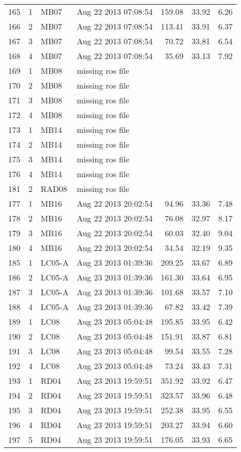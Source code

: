 \documentclass{article}
\begin{document}
\begin{longtable}{ccllrrr}
\hline 
165&1&MB07&Aug 22 2013 07:08:54&159.08&33.92&6.26\\
166&2&MB07&Aug 22 2013 07:08:54&113.41&33.91&6.37\\
167&3&MB07&Aug 22 2013 07:08:54&70.72&33.81&6.54\\
168&4&MB07&Aug 22 2013 07:08:54&35.69&33.13&7.92\\
\hline 
169&1&MB08&missing ros file&&&\\
170&2&MB08&missing ros file&&&\\
171&3&MB08&missing ros file&&&\\
172&4&MB08&missing ros file&&&\\
\hline 
173&1&MB14&missing ros file&&&\\
174&2&MB14&missing ros file&&&\\
175&3&MB14&missing ros file&&&\\
176&4&MB14&missing ros file&&&\\
\hline 
181&2&RAD08&missing ros file&&&\\
\hline 
177&1&MB16&Aug 22 2013 20:02:54&94.96&33.36&7.48\\
178&2&MB16&Aug 22 2013 20:02:54&76.08&32.97&8.17\\
179&3&MB16&Aug 22 2013 20:02:54&60.03&32.40&9.04\\
180&4&MB16&Aug 22 2013 20:02:54&34.54&32.19&9.35\\
\hline 
185&1&LC05-A&Aug 23 2013 01:39:36&209.25&33.67&6.89\\
186&2&LC05-A&Aug 23 2013 01:39:36&161.30&33.64&6.95\\
187&3&LC05-A&Aug 23 2013 01:39:36&101.68&33.57&7.10\\
188&4&LC05-A&Aug 23 2013 01:39:36&67.82&33.42&7.39\\
\hline 
189&1&LC08&Aug 23 2013 05:04:48&195.85&33.95&6.42\\
190&2&LC08&Aug 23 2013 05:04:48&151.91&33.87&6.81\\
191&3&LC08&Aug 23 2013 05:04:48&99.54&33.55&7.28\\
192&4&LC08&Aug 23 2013 05:04:48&73.24&33.43&7.31\\
\hline 
193&1&RD04&Aug 23 2013 19:59:51&351.92&33.92&6.47\\
194&2&RD04&Aug 23 2013 19:59:51&323.57&33.96&6.48\\
195&3&RD04&Aug 23 2013 19:59:51&252.38&33.95&6.55\\
196&4&RD04&Aug 23 2013 19:59:51&203.27&33.94&6.60\\
197&5&RD04&Aug 23 2013 19:59:51&176.05&33.93&6.65\\

\end{longtable}
\end{document}
